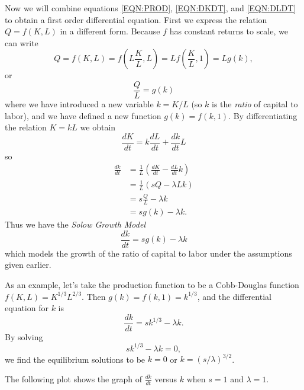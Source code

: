 \documentclass[reqno]{immbook}
\begin{document}
Now we will combine equations \eqref{EQN:PROD}, \eqref{EQN:DKDT},
and \eqref{EQN:DLDT} to obtain a first order differential equation.
First we express the relation $Q=f(K,L)$ in a different form.
Because $f$ has constant returns to scale, we can write
\begin{equation}
   Q = f(K,L) = f\left(L\frac{K}{L},L\right) 
        = Lf\left(\frac{K}{L},1\right) = Lg(k),
   \label{EQN:QG}
\end{equation}
or
\begin{equation}
  \frac{Q}{L} = g(k)
\end{equation}
where we have introduced a new variable $k = K/L$
(so $k$ is the \emph{ratio} of capital to labor),
and we have defined a new function $g(k) = f(k,1)$.
By differentiating the relation $K = kL$ we obtain
\begin{equation}
   \frac{dK}{dt}  = k\frac{dL}{dt} + \frac{dk}{dt} L
\end{equation}
so
\begin{equation}
\begin{split}
   \frac{dk}{dt} & = \frac{1}{L} \left(\frac{dK}{dt} - \frac{dL}{dt} k\right) \\
                    & = \frac{1}{L} \left( sQ - \lambda L k \right) \\
                    & = s \frac{Q}{L} - \lambda k \\
                    & = s g(k) - \lambda k .
\end{split}
\end{equation}
Thus we have the \emph{Solow Growth Model} \cite{Solow}
\begin{equation}
  \frac{dk}{dt} = s g(k) - \lambda k
\end{equation}
which models the growth of the ratio of capital to labor
under the assumptions given earlier.

As an example, let's take the production function to be a
Cobb-Douglas function $f(K,L) = K^{1/3}L^{2/3}$.
Then $g(k) = f(k,1) = k^{1/3}$, and the differential equation for
$k$ is
\begin{equation}
   \frac{dk}{dt} = sk^{1/3} - \lambda k .
\label{eqn:solowcobb}
\end{equation}
By solving
\[
   sk^{1/3} - \lambda k = 0,
\]
we find the equilibrium solutions to be $k=0$ or $k=(s/\lambda)^{3/2}$.

The following plot shows the graph of $\frac{dk}{dt}$ versus $k$ when $s=1$ and
 $\lambda=1$.

\centerline{}
\end{document}
